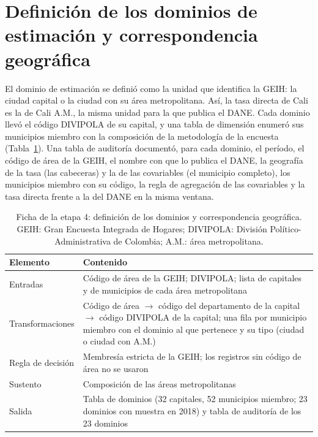 \section{Definición de los dominios de estimación y correspondencia geográfica}
\label{sec:met_dominios}

El dominio de estimación se definió como la unidad que identifica la GEIH: la ciudad capital o la ciudad con su área metropolitana. Así, la tasa directa de Cali es la de Cali A.M., la misma unidad para la que publica el DANE. Cada dominio llevó el código DIVIPOLA de su capital, y una tabla de dimensión enumeró sus municipios miembro con la composición de la metodología de la encuesta (Tabla~\ref{tab:met_dominios}). Una tabla de auditoría documentó, para cada dominio, el período, el código de área de la GEIH, el nombre con que lo publica el DANE, la geografía de la tasa (las cabeceras) y la de las covariables (el municipio completo), los municipios miembro con su código, la regla de agregación de las covariables y la tasa directa frente a la del DANE en la misma ventana.

\begin{table}[!htbp]
\centering
\small
\caption[Ficha de la etapa 4: definición de los dominios y correspondencia geográfica]{Ficha de la etapa 4: definición de los dominios y correspondencia geográfica. GEIH: Gran Encuesta Integrada de Hogares; DIVIPOLA: División Político-Administrativa de Colombia; A.M.: área metropolitana.}
\label{tab:met_dominios}
\renewcommand{\arraystretch}{1.15}
\begin{tabularx}{\linewidth}{>{\raggedright\arraybackslash}p{2.8cm} >{\raggedright\arraybackslash}X}
\toprule
Elemento & Contenido \\
\midrule
Entradas & Código de área de la GEIH; DIVIPOLA; lista de capitales y de municipios de cada área metropolitana \\
Transformaciones & Código de área $\to$ código del departamento de la capital $\to$ código DIVIPOLA de la capital; una fila por municipio miembro con el dominio al que pertenece y su tipo (ciudad o ciudad con A.M.) \\
Regla de decisión & Membresía estricta de la GEIH; los registros sin código de área no se usaron \\
Sustento & Composición de las áreas metropolitanas \cite[p.~9]{DANE_GEIH_Metodologia2016} \\
Salida & Tabla de dominios (32 capitales, 52 municipios miembro; 23 dominios con muestra en 2018) y tabla de auditoría de los 23 dominios \\
\bottomrule
\end{tabularx}
\end{table}

